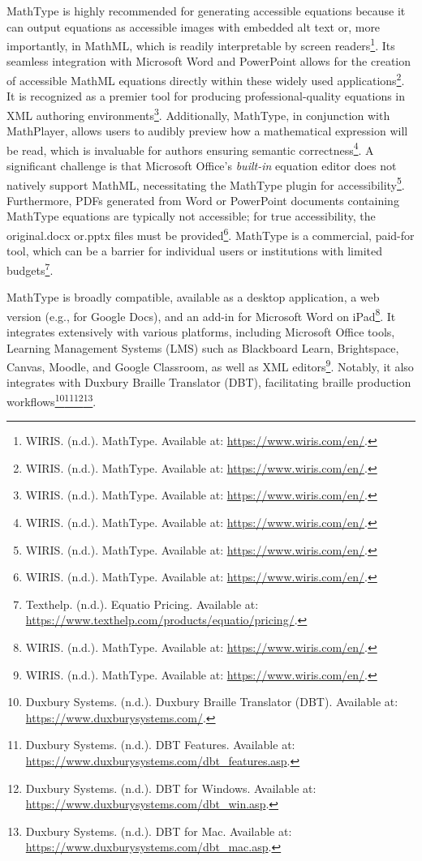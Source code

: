 MathType is highly recommended for generating accessible equations because it can output equations as accessible images with embedded alt text or, more importantly, in MathML, which is readily interpretable by screen readers\footnote{WIRIS. (n.d.). MathType. Available at: \url{https://www.wiris.com/en/}.}. Its seamless integration with Microsoft Word and PowerPoint allows for the creation of accessible MathML equations directly within these widely used applications\footnote{WIRIS. (n.d.). MathType. Available at: \url{https://www.wiris.com/en/}.}. It is recognized as a premier tool for producing professional-quality equations in XML authoring environments\footnote{WIRIS. (n.d.). MathType. Available at: \url{https://www.wiris.com/en/}.}. Additionally, MathType, in conjunction with MathPlayer, allows users to audibly preview how a mathematical expression will be read, which is invaluable for authors ensuring semantic correctness\footnote{WIRIS. (n.d.). MathType. Available at: \url{https://www.wiris.com/en/}.}. A significant challenge is that Microsoft Office's \textit{built-in} equation editor does not natively support MathML, necessitating the MathType plugin for accessibility\footnote{WIRIS. (n.d.). MathType. Available at: \url{https://www.wiris.com/en/}.}. Furthermore, PDFs generated from Word or PowerPoint documents containing MathType equations are typically not accessible; for true accessibility, the original.docx or.pptx files must be provided\footnote{WIRIS. (n.d.). MathType. Available at: \url{https://www.wiris.com/en/}.}. MathType is a commercial, paid-for tool, which can be a barrier for individual users or institutions with limited budgets\footnote{Texthelp. (n.d.). Equatio Pricing. Available at: \url{https://www.texthelp.com/products/equatio/pricing/}.}.

MathType is broadly compatible, available as a desktop application, a web version (e.g., for Google Docs), and an add-in for Microsoft Word on iPad\footnote{WIRIS. (n.d.). MathType. Available at: \url{https://www.wiris.com/en/}.}. It integrates extensively with various platforms, including Microsoft Office tools, Learning Management Systems (LMS) such as Blackboard Learn, Brightspace, Canvas, Moodle, and Google Classroom, as well as XML editors\footnote{WIRIS. (n.d.). MathType. Available at: \url{https://www.wiris.com/en/}.}. Notably, it also integrates with Duxbury Braille Translator (DBT), facilitating braille production workflows\footnote{Duxbury Systems. (n.d.). Duxbury Braille Translator (DBT). Available at: \url{https://www.duxburysystems.com/}.}\footnote{Duxbury Systems. (n.d.). DBT Features. Available at: \url{https://www.duxburysystems.com/dbt_features.asp}.}\footnote{Duxbury Systems. (n.d.). DBT for Windows. Available at: \url{https://www.duxburysystems.com/dbt_win.asp}.}\footnote{Duxbury Systems. (n.d.). DBT for Mac. Available at: \url{https://www.duxburysystems.com/dbt_mac.asp}.}.

